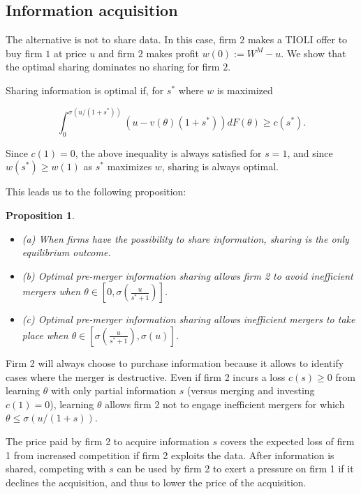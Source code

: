 \documentclass[a4paper,leqno]{article}%
\newtheorem{prop}{Proposition}
\renewcommand{\t}{\theta}
\newcommand{\s}{\sigma}
\begin{document}
\medskip

\subsection{Information acquisition}

The alternative is not to share data. In this case, firm $2$ makes a TIOLI offer to buy firm $1$ at price $u$ and firm $2$ makes profit $w(0):=W^M-u$. We show that the optimal sharing dominates no sharing for firm $2$. 

\medskip

Sharing information is optimal if, for $s^*$ where $w$ is maximized

\[
\int_{0}^{\s(u/(1+s^*))}(u-v(\t)(1+s^*))dF(\t)\geq c(s^*).
\]

Since $c(1)=0$, the above inequality is always satisfied for $s=1$, and since $w(s^*)\geq w(1)$ as $s^*$ maximizes $w$, sharing is always optimal.



This leads us to the following proposition:

\begin{prop}~~\label{prop:1}

\begin{itemize}
    \item (a) When firms have the possibility to share information, sharing is the only equilibrium outcome.
    \item (b) Optimal pre-merger information sharing allows firm 2 to avoid inefficient mergers when $\t\in\left[0,\s(\frac{u}{s^*+1})\right]$.
    \item (c) Optimal pre-merger information sharing allows inefficient mergers to take place when $\t\in\left[\s(\frac{u}{s^*+1}),\s(u)\right]$.
\end{itemize} 

\end{prop}

\medskip

Firm 2 will always choose to purchase information because it allows to identify cases where the merger is destructive. Even if firm 2 incurs a loss $c(s)\geq 0$ from learning $\t$ with only partial information $s$ (versus merging and investing $c(1)=0$), learning $\t$ allows firm 2 not to engage inefficient mergers for which $\t\leq \s(u/(1+s))$. 

\medskip

The price paid by firm 2 to acquire information $s$ covers the expected loss of firm 1 from increased competition if firm 2 exploits the data. After information is shared, competing with $s$ can be used by firm 2 to exert a pressure on firm 1 if it declines the acquisition, and thus to lower the price of the acquisition. 
\end{document}
